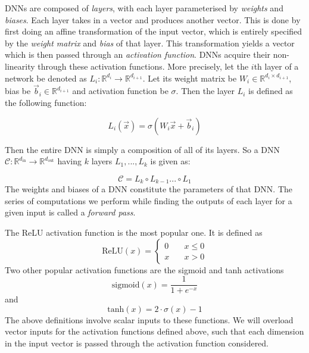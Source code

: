 \documentclass{ociamthesis}
\begin{document}
DNNs are composed of \emph{layers}, with each layer parameterised by
\emph{weights} and \emph{biases}. Each layer takes in a vector and produces
another vector. This is done by first doing an affine transformation of the
input vector, which is entirely specified by the \emph{weight matrix} and
\emph{bias} of that layer. This transformation yields a vector which is then
passed through an \emph{activation function}. DNNs acquire their non-linearity
through these activation functions. More precisely, let the $i$th layer of a
network be denoted as $L_i: \mathbb{R}^{d_{i}} \to \mathbb{R}^{d_{i+1}}$. Let
its weight matrix be $W_i \in \mathbb{R}^{d_i \times d_{i+1}}$, bias be
$\vec{b}_i \in \mathbb{R}^{d_{i+1}}$ and activation function be $\sigma$. Then
the layer $L_i$ is defined as the following function:

\begin{equation*}
    L_i(\vec{x})
    = \sigma(W_i\vec{x} + \vec{b}_i)
\end{equation*}

Then the entire DNN is simply a composition of all of its layers. So a DNN
$\mathcal{C}: \mathbb{R}^{d_\text{in}} \to \mathbb{R}^{d_\text{out}}$ having $k$
layers $L_1,...,L_k$ is given as:

\begin{equation*}
    \mathcal{C} = L_k \circ L_{k-1} ... \circ L_1
\end{equation*}
The weights and biases of a DNN constitute the parameters of that DNN. The
series of computations we perform while finding the outputs of each layer for a
given input is called a \emph{forward pass}.

The ReLU activation function is the most popular one. It is defined as
\begin{equation*}
    \text{ReLU}(x) = 
    \left\{
        \begin{array}{ll}
            0 & \quad x \leq 0 \\
            x & \quad x > 0
        \end{array}
    \right.
\end{equation*}
Two other popular activation functions are the sigmoid and tanh activations
\begin{equation*}
    \text{sigmoid}(x)=\frac{1}{1+e^{-x}}
\end{equation*} and
\begin{equation*}
    \text{tanh}(x) = 2\cdot\sigma(x) - 1
\end{equation*}
The above definitions involve scalar inputs to these functions. We will overload
vector inputs for the activation functions defined above, such that each
dimension in the input vector is passed through the activation function
considered.
\end{document}
